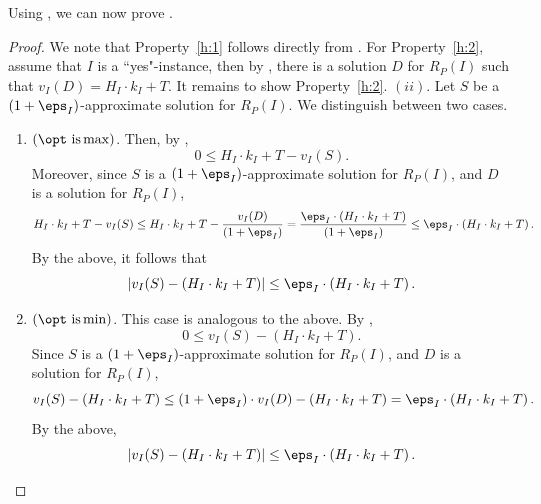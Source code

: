 Using , we can now prove . 
\thmH*
\begin{proof}
We note that Property~\ref{h:1} follows directly from . For Property~\ref{h:2}, assume that $I$ is a ``yes"-instance, then by , there is a solution $D$ for $R_P(I)$ such that $v_I(D) = H_I \cdot k_I+T$. It remains to show Property~\ref{h:2}. $(ii)$.
Let $S$ be a $(1+\eps_I)$-approximate solution for $R_P(I)$. We distinguish between two cases. 
	
		\begin{enumerate}
		\item $(\opt \textnormal{ is}   \max)$. Then, by ,
		\begin{equation*}
			\label{eq:Max1}
			0 \leq H_I \cdot k_I+T-v_I(S).
		\end{equation*} Moreover, since $S$ is a $(1+\eps_I)$-approximate solution for $R_P(I)$, and $D$ is a solution for $R_P(I)$,
		\begin{equation*}
			\label{eq:MaxApprox}
	H_I \cdot k_I+T-v_I(S) \leq H_I \cdot k_I+T - \frac{v_I(D)}{(1+\eps_I)} =  \frac{\eps_I \cdot \left(H_I \cdot k_I+T \right) }{(1+\eps_I)} \leq \eps_I \cdot \left(H_I \cdot k_I+T \right). 
		\end{equation*} %
	By the above, it follows that%
	\begin{equation*}
			  \left|	v_I(S)-\left(H_I \cdot k_I+T\right) \right|	\leq 	\eps_I \cdot \left(H_I \cdot k_I+T\right). 
	\end{equation*}
		\item  $(\opt \textnormal{ is}   \min)$. This case is analogous to the above.  By , 
		\begin{equation*}
			\label{eq:Min1}
	0 \leq v_I(S) - \left(H_I \cdot k_I+T\right). 
		\end{equation*} Since $S$ is a $(1+\eps_I)$-approximate solution for $R_P(I)$, and $D$ is a solution for $R_P(I)$,
		\begin{equation*}
			\label{eq:MinApprox}
		v_I(S) - \left(H_I \cdot k_I+T\right) \leq (1+\eps_I) \cdot v_I(D) - \left(H_I \cdot k_I+T\right) =   \eps_I \cdot \left(H_I \cdot k_I+T \right). 
		\end{equation*} 
		By the above, 
		\begin{equation*}
			\left|	v_I(S)-\left(H_I \cdot k_I+T\right) \right|	\leq 	\eps_I \cdot \left(H_I \cdot k_I+T\right). 
		\end{equation*}


\end{enumerate}
\end{proof}
